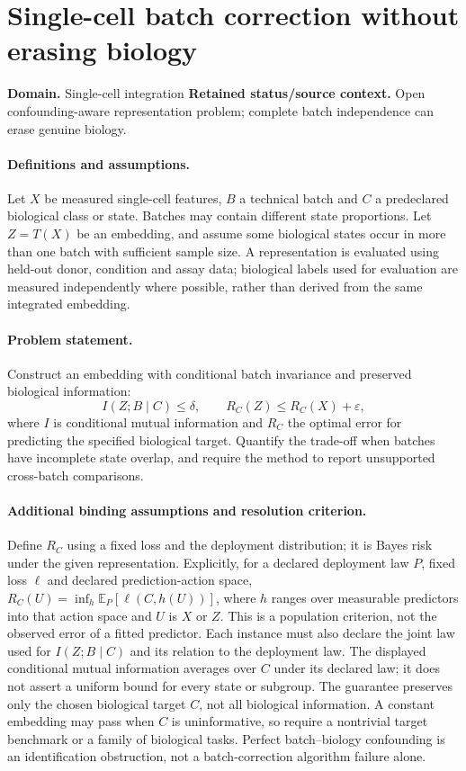\documentclass[11pt]{article}
\begin{document}
\section*{Single-cell batch correction without erasing biology}
\label{prob:070}
\label{rank:223}
\par\smallskip

\noindent\textbf{Domain.} Single-cell integration \quad \textbf{Retained status/source context.} Open confounding-aware representation problem; complete batch independence can erase genuine biology.
\paragraph{Definitions and assumptions.} Let $X$ be measured single-cell features, $B$ a technical batch and $C$ a predeclared biological class or state. Batches may contain different state proportions. Let $Z=T(X)$ be an embedding, and assume some biological states occur in more than one batch with sufficient sample size. A representation is evaluated using held-out donor, condition and assay data; biological labels used for evaluation are measured independently where possible, rather than derived from the same integrated embedding.
\paragraph{Problem statement.} Construct an embedding with conditional batch invariance and preserved biological information:
\[I(Z;B\mid C)\le\delta,\qquad R_C(Z)\le R_C(X)+\varepsilon,\]
where $I$ is conditional mutual information and $R_C$ the optimal error for predicting the specified biological target. Quantify the trade-off when batches have incomplete state overlap, and require the method to report unsupported cross-batch comparisons.
\paragraph{Additional binding assumptions and resolution criterion.} Define $R_C$ using a fixed loss and the deployment distribution; it is Bayes risk under the given representation. Explicitly, for a declared deployment law $P$, fixed loss $\ell$ and declared prediction-action space, $R_C(U)=\inf_h\mathbb{E}_P[\ell(C,h(U))]$, where $h$ ranges over measurable predictors into that action space and $U$ is $X$ or $Z$. This is a population criterion, not the observed error of a fitted predictor. Each instance must also declare the joint law used for $I(Z;B\mid C)$ and its relation to the deployment law. The displayed conditional mutual information averages over $C$ under its declared law; it does not assert a uniform bound for every state or subgroup. The guarantee preserves only the chosen biological target $C$, not all biological information. A constant embedding may pass when $C$ is uninformative, so require a nontrivial target benchmark or a family of biological tasks. Perfect batch--biology confounding is an identification obstruction, not a batch-correction algorithm failure alone.
\end{document}
